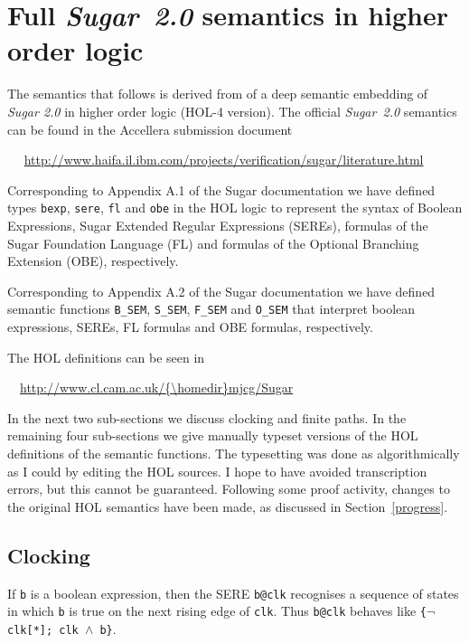 \documentclass{llncs}
\newcommand\Sugar{{\it{Sugar~2.0}}\xspace}
\renewcommand{\t}[1]{\texttt{#1}}
\begin{document}
\section{Full \Sugar semantics in higher order logic}\label{SugarSemantics}

The semantics that follows is derived from of a deep semantic embedding of
{\it Sugar 2.0} in higher order logic (HOL-4 version).
The official  \Sugar semantics 
can be found in the Accellera submission document \cite{Accellera}


\medskip

~~{
\url{http://www.haifa.il.ibm.com/projects/verification/sugar/literature.html}}

\medskip

Corresponding to Appendix A.1 of the Sugar documentation
we have defined types \texttt{bexp}, \texttt{sere}, \texttt{fl} and
\texttt{obe} in the HOL logic to represent the syntax of Boolean Expressions, Sugar
Extended Regular Expressions (SEREs), formulas of the Sugar Foundation
Language (FL) and formulas of the Optional Branching Extension (OBE),
respectively.


Corresponding to Appendix A.2 of the Sugar documentation
we have defined semantic functions \texttt{B\_SEM}, \texttt{S\_SEM},
\texttt{F\_SEM} and \texttt{O\_SEM} that interpret boolean expressions,
SEREs, FL formulas and OBE formulas, respectively.

The HOL definitions can be seen in

\medskip

~~{\url{http://www.cl.cam.ac.uk/{\homedir}mjcg/Sugar}}

\medskip

In the next two sub-sections we discuss clocking and finite paths.
In the remaining four sub-sections 
we give manually
typeset versions of the HOL definitions of the semantic functions. The
typesetting was done as algorithmically as I could by editing the HOL
sources. I hope to have avoided
transcription errors, but this cannot be guaranteed. Following
some proof activity, changes to the original HOL semantics have been
made, as discussed in Section~\ref{progress}.

\subsection{Clocking}

If \t{b} is a boolean expression, then the SERE \texttt{b@clk} recognises
a sequence of states in which \t{b} is true on the next rising edge of \texttt{clk}.
Thus \texttt{b@clk} behaves like \texttt{\{$\neg$clk[*]; clk ${\wedge}$ b\}}.
\end{document}
